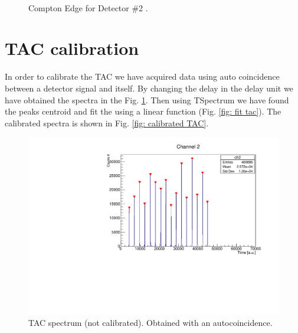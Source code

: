 \documentclass[a4paper,11pt]{article}
\begin{document}
\begin{figure}[h!]
\centering
{} \quad
{} \\
\caption{Compton Edge for Detector \#2 .}
\end{figure}

\clearpage
\section*{TAC calibration}
In order to calibrate the TAC we have acquired data using auto coincidence between a detector signal and itself. By changing the delay in the delay unit we have obtained the spectra in the Fig. \ref{fig: uncalibrated TAC}. Then using TSpectrum we have found the peaks centroid and fit the using a linear function (Fig. \ref{fig: fit tac}). The calibrated spectra is shown in Fig. \ref{fig: calibrated TAC}.
\begin{figure}[h!]
\centering
\includegraphics[width=\textwidth]{tac_uncalibrated_spectrum.pdf}
\caption{TAC spectrum (not calibrated). Obtained with an autocoincidence.}
\label{fig: uncalibrated TAC}
\end{figure}
\end{document}
